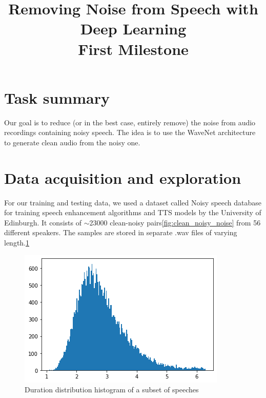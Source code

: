 \documentclass[12pt]{article}
\title{Removing Noise from Speech with Deep Learning\\
	\Large{First Milestone}}
\author{}
\date{}
\begin{document}

	\maketitle
	\section{Task summary}
	Our goal is to reduce (or in the best case, entirely remove) the noise from audio recordings containing noisy speech. The idea is to use the WaveNet\cite{wavenet}\cite{rethage2018wavenet} architecture to generate clean audio from the noisy one.
	
	
	\section{Data acquisition and exploration}
	For our training and testing data, we used a dataset called Noisy speech database for training speech enhancement algorithms and TTS models\cite{dataset} by the University of Edinburgh. It consists of $\sim$23000 clean-noisy pairs\ref{fig:clean_noisy_noise} from 56 different speakers. 
	The samples are stored in separate .wav files of varying length.\ref{fig:durations}  

	\begin{figure}[H]
		\centering
		\includegraphics[width=.5\linewidth]{durations}
		\caption{Duration distribution histogram of a subset of speeches}
		\label{fig:durations}
	\end{figure}
\end{document}

